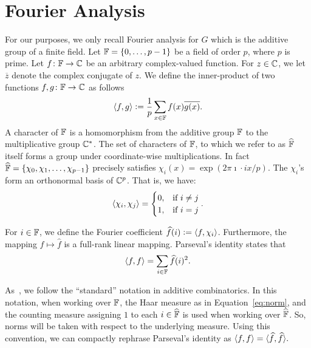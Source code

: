 \section{Fourier Analysis}
For our purposes, we only recall Fourier analysis for $G$ which is the additive group of a finite field.
Let ${\mathbb F}=\{0,\dotsc,p-1\}$ be a field of order $p$, where $p$ is prime.
Let $f \colon {\mathbb F} \to {\mathbb C} $ be an arbitrary complex-valued function.
For $z\in {\mathbb C}$, we let $\overline{z}$ denote the complex conjugate of $z$.
We define the inner-product of two functions $f,g\colon{\mathbb F}\to{\mathbb C}$ as follows
\begin{equation}\label{eq:norm}
\langle f,g\rangle {\;\vcentcolon=\;} \frac1p \sum_{x\in{\mathbb F}} f(x)\overline{g(x)}.
\end{equation}
A character of $\mathbb{F}$ is a homomorphism from the additive group $\mathbb{F}$ to the multiplicative group ${\mathbb C}^*$.
The set of characters of $\mathbb{F}$, to which we refer to as $\widehat{\mathbb{F}}$ itself forms a group under coordinate-wise multiplications. In fact $\widehat{\mathbb{F}}=\left\{\chi_0,\chi_1,\dotsc,\chi_{p-1}\right\}$ precisely satisfies
$\chi_i(x) = \exp\left(2\pi \imath \cdot ix/p\right)$. The $\chi_i$'s form an orthonormal basis of
${\mathbb C}^p$. That is, we have:
\begin{align}
\langle\chi_i,\chi_j\rangle = \begin{cases}0,&\text{if }i\neq j\\1,&\text{if }i=j\end{cases}.
\end{align}
  
For $i\in{\mathbb F}$, we define the Fourier coefficient $\widehat f(i){\;\vcentcolon=\;} \langle f,\chi_i\rangle$. 
Furthermore, the mapping $f\mapsto \widehat f$ is a full-rank linear mapping. 
Parseval's identity states that
\begin{align}
\langle f,f\rangle = \sum_{i\in{\mathbb F}} \widehat f(i)^2.  
\end{align}
  
As~\cite{EPRINT:BDIR19}, we follow the “standard” notation in additive combinatorics. In this notation, when working over $\mathbb{F}$, the Haar measure as in Equation~\ref{eq:norm}, and the counting measure assigning $1$ to each $i\in\widehat{\mathbb{F}}$ is used when working over $\widehat{\mathbb{F}}$. So, norms will be taken with respect to the underlying measure. Using this convention, we can compactly rephrase Parseval's identity as $\langle f,f\rangle = \langle\widehat{f},\widehat{f}\rangle.$

